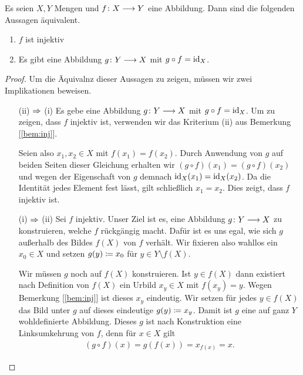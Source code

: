 \begin{bem}

  Es seien $X,Y$ Mengen und $f\colon X \longrightarrow Y$ eine Abbildung. Dann sind die
  folgenden Aussagen äquivalent.

  \begin{enumerate}
    \item $f$ ist injektiv
    \item Es gibt eine Abbildung $g\colon Y \longrightarrow X$ mit $g\circ f = \operatorname{id}_{X}$.
  \end{enumerate}

  \begin{proof}
    Um die Äquivalnz dieser Aussagen zu zeigen, müssen wir zwei
    Implikationen beweisen.
    \begin{itemize}
    \item[\tiny{(ii) $\Rightarrow$ (i)}] Es gebe eine Abbildung $g\colon Y \longrightarrow X$
      mit $g\circ f = \operatorname{id}_{X}$. Um zu zeigen, dass $f$ injektiv ist,
      verwenden wir das Kriterium (ii) aus Bemerkung [\ref{bem:inj}].

      Seien also $x_{1}, x_{2} \in X$ mit $f(x_{1}) = f(x_{2})$. Durch
      Anwendung von $g$ auf beiden Seiten dieser Gleichung erhalten wir
      $(g\circ f)(x_{1}) = (g\circ f)(x_{2})$ und wegen der Eigenschaft von
      $g$ demnach $\operatorname{id}_{X}(x_{1})=\operatorname{id}_{X}(x_{2})$. Da die Identität jedes
      Element fest lässt, gilt schließlich $x_{1}=x_{2}$. Dies zeigt, dass
      $f$ injektiv ist.
    \item[\tiny{(i) $\Rightarrow$ (ii)}] Sei $f$ injektiv. Unser Ziel ist es, eine
      Abbildung $g\colon Y \longrightarrow X$ zu konstruieren, welche $f$ rückgängig
      macht. Dafür ist es uns egal, wie sich $g$ außerhalb des Bildes
      $f(X)$ von $f$ verhält. Wir fixieren also wahllos ein $x_{0}\in X$
      und setzen $g(y) \coloneqq x_{0}$ für $y\in Y\setminus f(X)$.

      Wir müssen $g$ noch auf $f(X)$ konstruieren. Ist $y\in f(X)$ dann
      existiert nach Definition von $f(X)$ ein Urbild $x_{y}\in X$ mit
      $f(x_{y})=y$. Wegen Bemerkung [\ref{bem:inj}] ist dieses $x_{y}$
      eindeutig. Wir setzen für jedes $y\in f(X)$ das Bild unter $g$ auf
      dieses eindeutige $g(y) \coloneqq x_{y}$. Damit ist $g$ eine auf ganz $Y$
      wohldefinierte Abbildung. Dieses $g$ ist nach Konstruktion eine
      Linksumkehrung von $f$, denn für $x\in X$ gilt
      \begin{align*}
        (g\circ f)(x) 
        = g (f(x))
        = x_{f(x)}
        = x.
      \end{align*}
    \end{itemize}
  \end{proof}
  
\end{bem}


